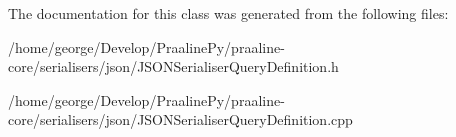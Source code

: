 The documentation for this class was generated from the following files\+:\begin{DoxyCompactItemize}
\item 
/home/george/\+Develop/\+Praaline\+Py/praaline-\/core/serialisers/json/J\+S\+O\+N\+Serialiser\+Query\+Definition.\+h\item 
/home/george/\+Develop/\+Praaline\+Py/praaline-\/core/serialisers/json/J\+S\+O\+N\+Serialiser\+Query\+Definition.\+cpp\end{DoxyCompactItemize}
